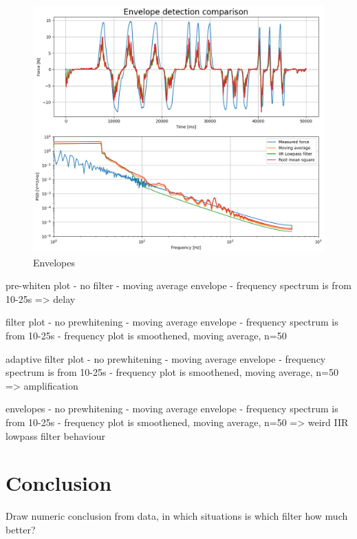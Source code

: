 \begin{figure}[h!t]
	\begin{center}
		\includegraphics[width=1.0\columnwidth]{images/measurement_envelopes.png}
	\end{center}
	\caption{Envelopes}
	\label{fig:result_envelopes}
\end{figure}

pre-whiten plot
- no filter
- moving average envelope
- frequency spectrum is from 10-25s
=> delay

filter plot
- no prewhitening
- moving average envelope
- frequency spectrum is from 10-25s
- frequency plot is smoothened, moving average, n=50

adaptive filter plot
- no prewhitening
- moving average envelope
- frequency spectrum is from 10-25s
- frequency plot is smoothened, moving average, n=50
=> amplification 

envelopes
- no prewhitening
- moving average envelope
- frequency spectrum is from 10-25s
- frequency plot is smoothened, moving average, n=50
=> weird IIR lowpass filter behaviour


\section{Conclusion}
Draw numeric conclusion from data, in which situations is which filter how much better?